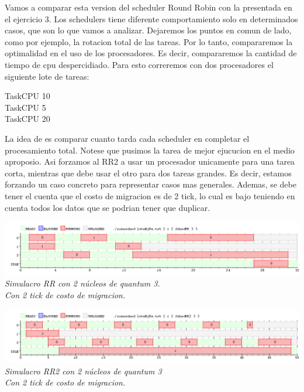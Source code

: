 Vamos a comparar esta version del scheduler Round Robin con la presentada en el ejercicio 3. Los schedulers tiene diferente comportamiento solo en 
determinados casos, que son lo que vamos a analizar. Dejaremos los puntos en comun de lado, como por ejemplo, la rotacion total de las tareas.
Por lo tanto, compararemos la optimalidad en el uso de los procesadores. Es decir, compararemos la cantidad de tiempo de cpu despercidiado. 
Para esto correremos con dos procesadores el siguiente lote de tareas:
\begin{center}
TaskCPU 10\\
TaskCPU 5\\
TaskCPU 20
\end{center}
 La idea de es comparar cuanto tarda cada scheduler en completar el procesamiento total. Notese que pusimos la tarea de mejor ejucucion en el medio 
 aproposio. Asi forzamos al RR2 a usar un procesador unicamente para una tarea corta, mientras que debe usar el otro para dos tareas grandes.
 Es decir, estamos forzando un caso concreto para representar casos mas generales. Ademas, se debe tener el cuenta que el costo de migracion 
 es de 2 tick, lo cual es bajo teniendo en cuenta todos los datos que se podrian tener que duplicar.

\vspace{\baselineskip}
\begin{center}
\includegraphics[scale=0.45]{../tp1/Test/resEj8Co2SBRR.png}
\\
\vspace{1pt}
\footnotesize\textit{Simulacro RR con 2 n\'ucleos de quantum 3.\\Con 2 tick de costo de migracion.}
\end{center}
\vspace{\baselineskip}

\vspace{\baselineskip}
\begin{center}
\includegraphics[scale=0.45]{../tp1/Test/resEj8Co2SBRR2.png}
\\
\vspace{1pt}
\footnotesize\textit{Simulacro RR2 con 2 n\'ucleos de quantum 3\\Con 2 tick de costo de migracion.}
\end{center}
\vspace{\baselineskip}


